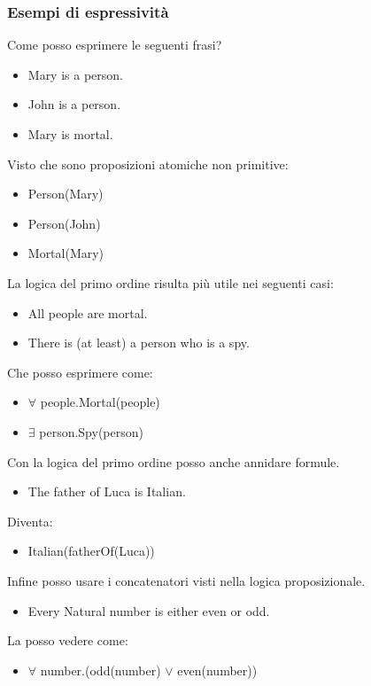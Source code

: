 \documentclass[../main.tex]{subfiles}
\begin{document}
   \subsubsection{Esempi di espressività}
   Come posso esprimere le seguenti frasi?
   \begin{itemize}
      \item Mary is a person.
      \item John is a person.
      \item Mary is mortal.
   \end{itemize}
   Visto che sono proposizioni atomiche non primitive:
   \begin{itemize}
      \item Person(Mary)
      \item Person(John)
      \item Mortal(Mary)
   \end{itemize}
   \vspace{1em}
   La logica del primo ordine risulta più utile nei seguenti casi:
   \begin{itemize}
      \item All people are mortal.
      \item There is (at least) a person who is a spy.
   \end{itemize}
   Che posso esprimere come:
   \begin{itemize}
      \item $\forall$ people.Mortal(people)
      \item $\exists$ person.Spy(person)
   \end{itemize}
   \vspace{1em}
   Con la logica del primo ordine posso anche annidare formule.
   \begin{itemize}
      \item The father of Luca is Italian.
   \end{itemize}
   Diventa:
   \begin{itemize}
      \item Italian(fatherOf(Luca))
   \end{itemize}
   \vspace{1em}
   Infine posso usare i concatenatori visti nella logica proposizionale.
   \begin{itemize}
      \item Every Natural number is either even or odd.
   \end{itemize}
   La posso vedere come:
   \begin{itemize}
      \item $\forall$ number.(odd(number) $\lor$ even(number))
   \end{itemize}
\end{document}
